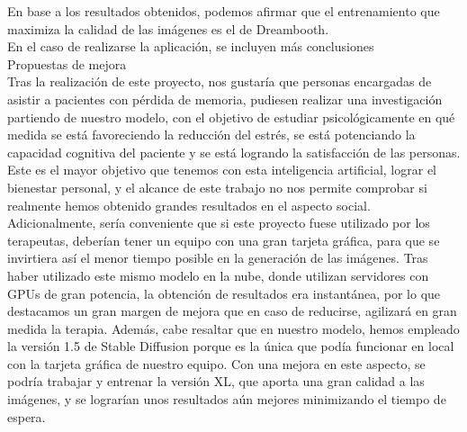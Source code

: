 En base a los resultados obtenidos, podemos afirmar que el entrenamiento que maximiza la calidad de las imágenes es el de Dreambooth.\\

En el caso de realizarse la aplicación, se incluyen más conclusiones\\

Propuestas de mejora\\

Tras la realización de este proyecto, nos gustaría que personas encargadas de asistir a pacientes con pérdida de memoria, pudiesen realizar una investigación partiendo de nuestro modelo, con el objetivo de estudiar psicológicamente en qué medida se está favoreciendo la reducción del estrés, se está potenciando la capacidad cognitiva del paciente y se está logrando la satisfacción de las personas. Este es el mayor objetivo que tenemos con esta inteligencia artificial, lograr el bienestar personal, y el alcance de este trabajo no nos permite comprobar si realmente hemos obtenido grandes resultados en el aspecto social.
Adicionalmente, sería conveniente que si este proyecto fuese utilizado por los terapeutas, deberían tener un equipo con una gran tarjeta gráfica, para que se invirtiera así el menor tiempo posible en la generación de las imágenes. Tras haber utilizado este mismo modelo en la nube, donde utilizan servidores con GPUs de gran potencia, la obtención de resultados era instantánea, por lo que destacamos un gran margen de mejora que en caso de reducirse, agilizará en gran medida la terapia. Además, cabe resaltar que en nuestro modelo, hemos empleado la versión 1.5 de Stable Diffusion porque es la única que podía funcionar en local con la tarjeta gráfica de nuestro equipo. Con una mejora en este aspecto, se podría trabajar y entrenar la versión XL, que aporta una gran calidad a las imágenes, y se lograrían unos resultados aún mejores minimizando el tiempo de espera.\\






